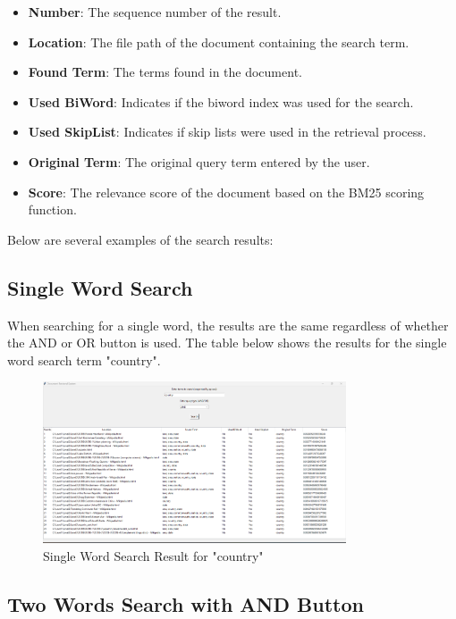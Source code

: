 \documentclass[a4paper,10pt]{article}
\begin{document}
\begin{itemize}
    \item \textbf{Number}: The sequence number of the result.
    \item \textbf{Location}: The file path of the document containing the search term.
    \item \textbf{Found Term}: The terms found in the document.
    \item \textbf{Used BiWord}: Indicates if the biword index was used for the search.
    \item \textbf{Used SkipList}: Indicates if skip lists were used in the retrieval process.
    \item \textbf{Original Term}: The original query term entered by the user.
    \item \textbf{Score}: The relevance score of the document based on the BM25 scoring function.
\end{itemize}

Below are several examples of the search results:

\subsection{Single Word Search}

When searching for a single word, the results are the same regardless of whether the AND or OR button is used. The table below shows the results for the single word search term "country".

\begin{figure}[H]
    \centering
    \includegraphics[width=0.8\textwidth]{search_results.png}
    \caption{Single Word Search Result for "country"}
    \label{fig:single-word-search}
\end{figure}
\vspace{110mm}

\subsection{Two Words Search with AND Button}
\end{document}

